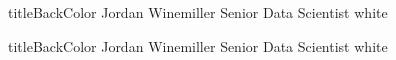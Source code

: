 \documentclass[11pt, onside, letterpaper, titlepage]{article}
\begin{document}
    \pageFooter

    \newpage

    \newPageHeader
    {titleBackColor}
    {Jordan}
    {Winemiller}
    {Senior Data Scientist}
    {white}

    \hspace*{-0.01 in}

    \pageFooter

    \newpage

    \newPageHeader
    {titleBackColor}
    {Jordan}
    {Winemiller}
    {Senior Data Scientist}
    {white}
\end{document}
